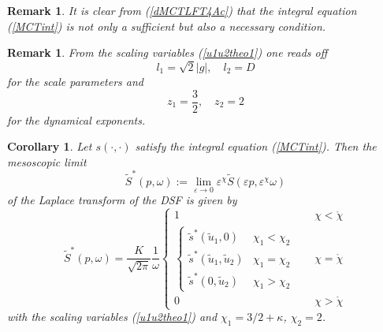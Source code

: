 \documentclass[12pt]{article}
\newtheorem{corollary}[theorem]{Corollary}
\newtheorem{remark}[theorem]{Remark}
\begin{document}
\begin{remark}
It is clear from (\ref{dMCTLFT4Ac}) 
that the integral equation (\ref{MCTint}) is not
only a sufficient but also a necessary condition.
\end{remark}

\begin{remark}
From the scaling variables (\ref{u1u2theo1}) one reads off
\begin{equation}
l_1 = \sqrt{2} |g|, \quad l_2 = D
\label{l1l2theo1}
\end{equation}
for the scale parameters and
\begin{equation}
z_1 = \frac{3}{2}, \quad z_2 = 2
\label{z1z2theo1}
\end{equation}
for the dynamical exponents.
\end{remark}




\begin{corollary}
\label{Coro:1}
Let $s (\cdot,\cdot)$ 
satisfy the integral equation (\ref{MCTint}).
Then the mesoscopic limit
\begin{equation}
\tilde{S}^{\ast}(p,\omega) := 
\lim_{\varepsilon \to 0} \varepsilon^{\chi}
\tilde{S}(\varepsilon p,\varepsilon^{\chi}\omega) 
\end{equation}
of the Laplace transform of the DSF is
given by
\begin{equation}
\tilde{S}^{\ast}(p,\omega) = \frac{K}{\sqrt{2\pi}} \frac{1}{\omega} 
\left\{\begin{array}{ll} 
1 & \chi < \mathring{\chi} \\[2mm]
\left\{\begin{array}{ll}
\tilde{s}^\ast(\tilde{u}_1,0) & \chi_1 < \chi_2  \\[2mm]
\tilde{s}^\ast(\tilde{u}_1,\tilde{u}_2) & \chi_1 = \chi_2  \\[2mm]
\tilde{s}^\ast(0,\tilde{u}_2) & \chi_1 > \chi_2 
\end{array} \right. 
\quad & \chi = \mathring{\chi} \\[8mm]
0& \chi > \mathring{\chi}
\end{array} \right.
\label{DSFcoro1}
\end{equation}
with the scaling variables (\ref{u1u2theo1})
and $\chi_1=3/2+\kappa$, $\chi_2 = 2$. 
\end{corollary}
\end{document}
